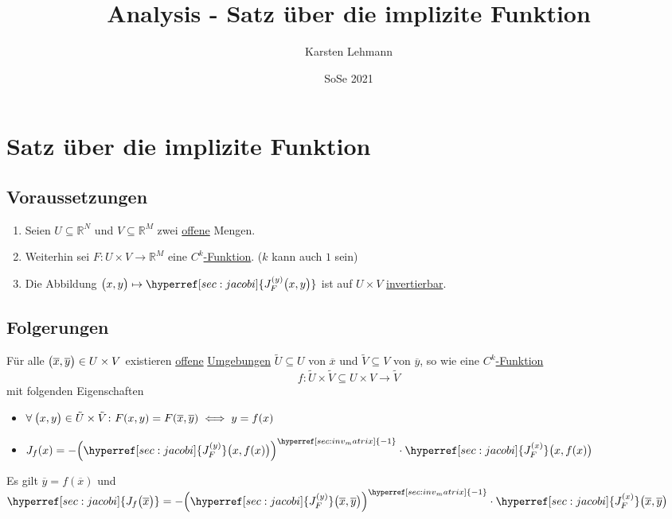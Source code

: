 \documentclass{scrreprt}
\author{Karsten Lehmann}
\date{SoSe 2021}
\title{Analysis - Satz über die implizite Funktion}
\begin{document}
\chapter{Satz über die implizite Funktion}

\section{Voraussetzungen}

\begin{enumerate}[1)]
\item \label{vor:1}
  Seien $U \subseteq \mathbb{R}^N$ und $V \subseteq \mathbb{R}^M$ zwei
  \hyperref[sec:offene_menge]{offene} Mengen.

\item \label{vor:2}
  Weiterhin sei $F \colon U \times V \to \mathbb{R}^M$ eine
  \hyperref[sec:c-k-funktion]{$C^k$-Funktion}.
  ($k$ kann auch $1$ sein)

\item \label{vor:3}
  Die Abbildung
  $\qty\big(x, y) \mapsto \hyperref[sec:jacobi]{J_F^{(y)}\qty\big(x, y)}$
  ist auf $U \times V$ \hyperref[sec:inv_matrix]{invertierbar}.
\end{enumerate}

\section{Folgerungen}

Für alle $\qty\big(\overline{x}, \overline{y}) \in U \times V$
existieren \hyperref[sec:offene_menge]{offene}
\hyperref[sec:umgebung]{Umgebungen}
$\tilde{U} \subseteq U$ von $\overline{x}$ und
$\tilde{V} \subseteq V$ von $\overline{y}$, so wie eine
\hyperref[sec:c-k-funktion]{$C^k$-Funktion}
\[
  f \colon \tilde{U} \times \tilde{V} \subseteq U \times V \to \tilde{V}
\]
mit folgenden Eigenschaften
\begin{itemize}
\item \label{folg:1}
  $\forall \: \qty\big(x, y) \in \tilde{U} \times \tilde{V} \colon F(x, y)
  = F(\overline{x}, \overline{y}) \iff y = f(x)$

\item \label{folg:2}
  $J_f(x) = - \qty(\hyperref[sec:jacobi]{J_F^{(y)}} \qty\big(x, f(x)))^{\hyperref[sec:inv_matrix]{-1}}
  \cdot \hyperref[sec:jacobi]{J_F^{(x)}} \qty\big(x, f(x))$
\end{itemize}

\label{folg:3}
Es gilt $\overline{y} = f(\overline{x})$ und
$\hyperref[sec:jacobi]{J_f\qty\big(\overline{x})}
= - \qty(\hyperref[sec:jacobi]{J_F^{(y)}} \qty\big(\overline{x}, \overline{y}))^{\hyperref[sec:inv_matrix]{-1}}
\cdot \hyperref[sec:jacobi]{J_F^{(x)}} \qty\big(\overline{x}, \overline{y})$
\end{document}
